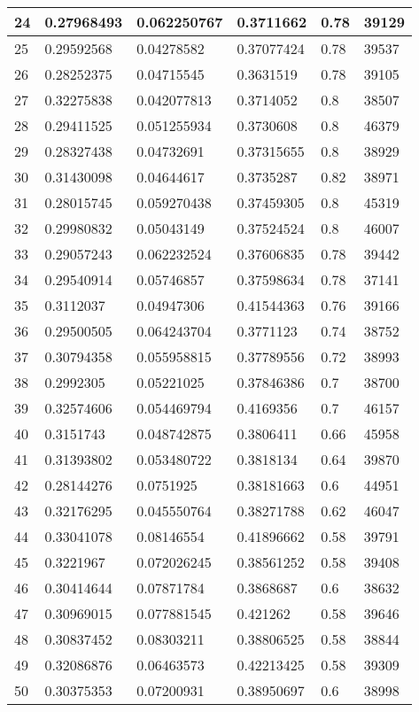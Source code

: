 \begin{longtable}{|l|l|l|l|l|l|}
24 & 0.27968493 & 0.062250767 & 0.3711662 & 0.78 & 39129 \\ \hline 
25 & 0.29592568 & 0.04278582 & 0.37077424 & 0.78 & 39537 \\ \hline 
26 & 0.28252375 & 0.04715545 & 0.3631519 & 0.78 & 39105 \\ \hline 
27 & 0.32275838 & 0.042077813 & 0.3714052 & 0.8 & 38507 \\ \hline 
28 & 0.29411525 & 0.051255934 & 0.3730608 & 0.8 & 46379 \\ \hline 
29 & 0.28327438 & 0.04732691 & 0.37315655 & 0.8 & 38929 \\ \hline 
30 & 0.31430098 & 0.04644617 & 0.3735287 & 0.82 & 38971 \\ \hline 
31 & 0.28015745 & 0.059270438 & 0.37459305 & 0.8 & 45319 \\ \hline 
32 & 0.29980832 & 0.05043149 & 0.37524524 & 0.8 & 46007 \\ \hline 
33 & 0.29057243 & 0.062232524 & 0.37606835 & 0.78 & 39442 \\ \hline 
34 & 0.29540914 & 0.05746857 & 0.37598634 & 0.78 & 37141 \\ \hline 
35 & 0.3112037 & 0.04947306 & 0.41544363 & 0.76 & 39166 \\ \hline 
36 & 0.29500505 & 0.064243704 & 0.3771123 & 0.74 & 38752 \\ \hline 
37 & 0.30794358 & 0.055958815 & 0.37789556 & 0.72 & 38993 \\ \hline 
38 & 0.2992305 & 0.05221025 & 0.37846386 & 0.7 & 38700 \\ \hline 
39 & 0.32574606 & 0.054469794 & 0.4169356 & 0.7 & 46157 \\ \hline 
40 & 0.3151743 & 0.048742875 & 0.3806411 & 0.66 & 45958 \\ \hline 
41 & 0.31393802 & 0.053480722 & 0.3818134 & 0.64 & 39870 \\ \hline 
42 & 0.28144276 & 0.0751925 & 0.38181663 & 0.6 & 44951 \\ \hline 
43 & 0.32176295 & 0.045550764 & 0.38271788 & 0.62 & 46047 \\ \hline 
44 & 0.33041078 & 0.08146554 & 0.41896662 & 0.58 & 39791 \\ \hline 
45 & 0.3221967 & 0.072026245 & 0.38561252 & 0.58 & 39408 \\ \hline 
46 & 0.30414644 & 0.07871784 & 0.3868687 & 0.6 & 38632 \\ \hline 
47 & 0.30969015 & 0.077881545 & 0.421262 & 0.58 & 39646 \\ \hline 
48 & 0.30837452 & 0.08303211 & 0.38806525 & 0.58 & 38844 \\ \hline 
49 & 0.32086876 & 0.06463573 & 0.42213425 & 0.58 & 39309 \\ \hline 
50 & 0.30375353 & 0.07200931 & 0.38950697 & 0.6 & 38998 \\ \hline 
\end{longtable}